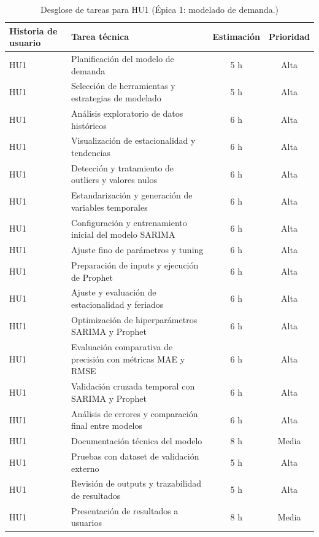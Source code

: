 \documentclass[
11pt, %
]{charter}
\begin{document}
\begin{table}[H]
\centering
\begin{tabular}{|l|p{6cm}|c|c|}
\hline
\textbf{Historia de usuario} & \textbf{Tarea técnica} & \textbf{Estimación} & \textbf{Prioridad} \\
\hline
HU1 & Planificación del modelo de demanda & 5 h & Alta \\
HU1 & Selección de herramientas y estrategias de modelado & 5 h & Alta \\
HU1 & Análisis exploratorio de datos históricos & 6 h & Alta \\
HU1 & Visualización de estacionalidad y tendencias & 6 h & Alta \\
HU1 & Detección y tratamiento de outliers y valores nulos & 6 h & Alta \\
HU1 & Estandarización y generación de variables temporales & 6 h & Alta \\
HU1 & Configuración y entrenamiento inicial del modelo SARIMA & 6 h & Alta \\
HU1 & Ajuste fino de parámetros y tuning & 6 h & Alta \\
HU1 & Preparación de inputs y ejecución de Prophet & 6 h & Alta \\
HU1 & Ajuste y evaluación de estacionalidad y feriados & 6 h & Alta \\
HU1 & Optimización de hiperparámetros SARIMA y Prophet & 6 h & Alta \\
HU1 & Evaluación comparativa de precisión con métricas MAE y RMSE & 6 h & Alta \\
HU1 & Validación cruzada temporal con SARIMA y Prophet & 6 h & Alta \\
HU1 & Análisis de errores y comparación final entre modelos & 6 h & Alta \\
HU1 & Documentación técnica del modelo & 8 h & Media \\
HU1 & Pruebas con dataset de validación externo & 5 h & Alta \\
HU1 & Revisión de outputs y trazabilidad de resultados & 5 h & Alta \\
HU1 & Presentación de resultados a usuarios & 8 h & Media \\
\hline
\end{tabular}
\caption{Desglose de tareas para HU1 (Épica 1: modelado de demanda.)}
\end{table}
\end{document}
